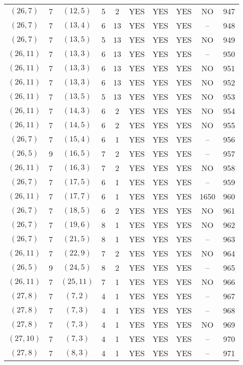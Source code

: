 \begin{longtable}{|c|c|c|c|c|c|c|c|c|c|}
$(26, 7)$ & 7 & $(12, 5)$ & 5 & 2 & YES & YES & YES & NO & 947\\
$(26, 7)$ & 7 & $(13, 4)$ & 6 & 13 & YES & YES & YES & -- & 948\\
$(26, 7)$ & 7 & $(13, 5)$ & 5 & 13 & YES & YES & YES & NO & 949\\
$(26, 11)$ & 7 & $(13, 3)$ & 6 & 13 & YES & YES & YES & -- & 950\\
$(26, 11)$ & 7 & $(13, 3)$ & 6 & 13 & YES & YES & YES & NO & 951\\
$(26, 11)$ & 7 & $(13, 3)$ & 6 & 13 & YES & YES & YES & NO & 952\\
$(26, 11)$ & 7 & $(13, 5)$ & 5 & 13 & YES & YES & YES & NO & 953\\
$(26, 11)$ & 7 & $(14, 3)$ & 6 & 2 & YES & YES & YES & NO & 954\\
$(26, 11)$ & 7 & $(14, 5)$ & 6 & 2 & YES & YES & YES & NO & 955\\
$(26, 7)$ & 7 & $(15, 4)$ & 6 & 1 & YES & YES & YES & -- & 956\\
$(26, 5)$ & 9 & $(16, 5)$ & 7 & 2 & YES & YES & YES & -- & 957\\
$(26, 11)$ & 7 & $(16, 3)$ & 7 & 2 & YES & YES & YES & NO & 958\\
$(26, 7)$ & 7 & $(17, 5)$ & 6 & 1 & YES & YES & YES & -- & 959\\
$(26, 11)$ & 7 & $(17, 7)$ & 6 & 1 & YES & YES & YES & 1650 & 960\\
$(26, 7)$ & 7 & $(18, 5)$ & 6 & 2 & YES & YES & YES & NO & 961\\
$(26, 7)$ & 7 & $(19, 6)$ & 8 & 1 & YES & YES & YES & NO & 962\\
$(26, 7)$ & 7 & $(21, 5)$ & 8 & 1 & YES & YES & YES & -- & 963\\
$(26, 11)$ & 7 & $(22, 9)$ & 7 & 2 & YES & YES & YES & NO & 964\\
$(26, 5)$ & 9 & $(24, 5)$ & 8 & 2 & YES & YES & YES & -- & 965\\
$(26, 11)$ & 7 & $(25, 11)$ & 7 & 1 & YES & YES & YES & NO & 966\\
$(27, 8)$ & 7 & $(7, 2)$ & 4 & 1 & YES & YES & YES & -- & 967\\
$(27, 8)$ & 7 & $(7, 3)$ & 4 & 1 & YES & YES & YES & -- & 968\\
$(27, 8)$ & 7 & $(7, 3)$ & 4 & 1 & YES & YES & YES & NO & 969\\
$(27, 10)$ & 7 & $(7, 3)$ & 4 & 1 & YES & YES & YES & -- & 970\\
$(27, 8)$ & 7 & $(8, 3)$ & 4 & 1 & YES & YES & YES & -- & 971\\

\end{longtable}
